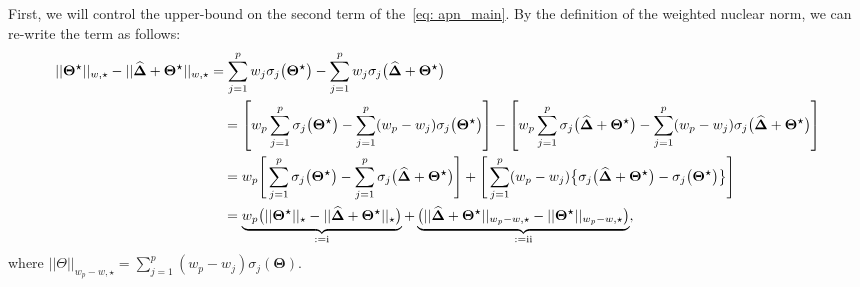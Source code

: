 \documentclass[alpha-refs]{wiley-article}
\newcommand{\RN}[1]{ \textup{\uppercase\expandafter{\romannumeral#1}} }
\begin{document}
First, we will control the upper-bound on the second term of the~\eqref{eq: apn_main}.
By the definition of the weighted nuclear norm, we can re-write the term as follows:
\begin{align}
    ||\boldsymbol{\Theta^{\star}}||_{w,\star} - ||\boldsymbol{\widehat{\Delta}} + \boldsymbol{\Theta^{\star}}||_{w,\star}
    &= \sum^{p}_{j = 1} w_{j}\sigma_{j}\big(\boldsymbol{\Theta^{\star}}\big) - \sum^{p}_{j = 1} w_{j}\sigma_{j}\big(\boldsymbol{\widehat{\Delta}} + \boldsymbol{\Theta^{\star}}\big)  \nonumber \\
    & \quad = \left[w_{p}\sum^{p}_{j = 1}\sigma_{j}\big(\boldsymbol{\Theta^{\star}}\big) - \sum^{p}_{j = 1}(w_{p} - w_{j})\sigma_{j}\big(\boldsymbol{\Theta^{\star}}\big)\right] - \left[w_{p}\sum^{p}_{j = 1}\sigma_{j}\big(\boldsymbol{\widehat{\Delta}} + \boldsymbol{\Theta^{\star}}\big) - \sum^{p}_{j = 1}(w_{p} - w_{j})\sigma_{j}\big(\boldsymbol{\widehat{\Delta}} + \boldsymbol{\Theta^{\star}}\big)\right] \nonumber \\
    & \quad = w_{p}\Bigg[ \sum^{p}_{j = 1}\sigma_{j}\big(\boldsymbol{\Theta^{\star}}\big) - \sum^{p}_{j = 1}\sigma_{j}\big(\boldsymbol{\widehat{\Delta}} + \boldsymbol{\Theta^{\star}}\big) \Bigg] + \Bigg[ \sum^{p}_{j=1}(w_{p} - w_{j})\big\{ \sigma_{j}\big(\boldsymbol{\widehat{\Delta}} + \boldsymbol{\Theta^{\star}}\big)-\sigma_{j}\big(\boldsymbol{\Theta^{\star}}\big)\big\}\Bigg] \nonumber\\
    & \quad = \underbrace{w_{p}\big( ||\boldsymbol{\Theta^{\star}}||_{\star} - ||\boldsymbol{\widehat{\Delta}} + \boldsymbol{\Theta^{\star}}||_{\star} \big)}_{:=\RN{1}} + \underbrace{\big( ||\boldsymbol{\widehat{\Delta}} + \boldsymbol{\Theta^{\star}}||_{w_{p}-w,\star} - ||\boldsymbol{\Theta^{\star}}||_{w_{p}-w,\star}\big)}_{:=\RN{2}}, \label{eq: wnn_diff}
\end{align}
where $||\Theta||_{w_{p} - w, \star} = \sum^{p}_{j = 1} (w_{p} - w_{j})\sigma_{j}(\boldsymbol{\Theta})$.
\end{document}

